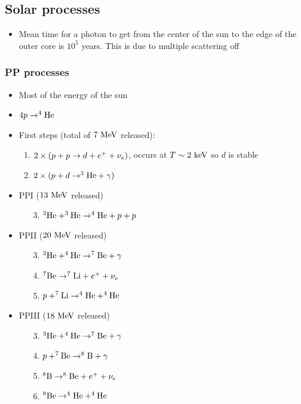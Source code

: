 \subsection{Solar processes}
\begin{itemize}
  \item Mean time for a photon to get from the center of the sun to the edge of the outer core is $10^5$ years. This is due to multiple scattering off \el
\end{itemize}
\subsubsection{PP processes}
\begin{itemize}
  \item Most of the energy of the sun
  \item $4p\rightarrow^{4}\text{He}$
  \item First steps (total of $7~\text{MeV}$ released):
  \begin{enumerate}
    \item $2\times(p+p\rightarrow d+e^{+}+\nu_e)$, occurs at $T\sim 2~\text{keV}$ so $d$ is stable
    \item $2\times(p+d\rightarrow^{3}\text{He}+\gamma)$
  \end{enumerate}
  \item PPI ($13~\text{MeV}$ released)
  \begin{enumerate}
    \item[3.] $^{3}\text{He}+^{3}\text{He}\rightarrow^{4}\text{He}+p+p$
  \end{enumerate}
  \item PPII ($20~\text{MeV}$ released)
  \begin{enumerate}
    \item[3.] $^{3}\text{He}+^{4}\text{He}\rightarrow^{7}\text{Be}+\gamma$
    \item[4.] $^{7}\text{Be}\rightarrow^{7}\text{Li}+e^{+}+\nu_e$
    \item[5.] $p+^{7}\text{Li}\rightarrow^{4}\text{He}+^{4}\text{He}$
  \end{enumerate}
  \item PPIII ($18~\text{MeV}$ released)
  \begin{enumerate}
    \item[3.] $^{3}\text{He}+^{4}\text{He}\rightarrow^{7}\text{Be}+\gamma$
    \item[4.] $p+^{7}\text{Be}\rightarrow^{8}\text{B}+\gamma$
    \item[5.] $^{8}\text{B} \rightarrow ^{8}\text{Be}+e^{+}+\nu_e$
    \item[6.] $^{8}\text{Be}\rightarrow ^{4}\text{He}+^{4}\text{He}$
  \end{enumerate}
\end{itemize}
